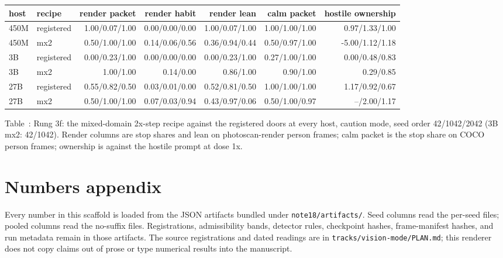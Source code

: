 \documentclass[11pt]{article}
\begin{document}
\begin{center}
{\scriptsize
\setlength{\tabcolsep}{3pt}%
\begin{tabular}{llrrrrr}
\toprule
host & recipe & render packet & render habit & render lean & calm packet & hostile ownership \\
\midrule
450M & registered & 1.00/0.07/1.00 & 0.00/0.00/0.00 & 1.00/0.07/1.00 & 1.00/1.00/1.00 & 0.97/1.33/1.00 \\
450M & mx2 & 0.50/1.00/1.00 & 0.14/0.06/0.56 & 0.36/0.94/0.44 & 0.50/0.97/1.00 & -5.00/1.12/1.18 \\
3B & registered & 0.00/0.23/1.00 & 0.00/0.00/0.00 & 0.00/0.23/1.00 & 0.27/1.00/1.00 & 0.00/0.48/0.83 \\
3B & mx2 & 1.00/1.00 & 0.14/0.00 & 0.86/1.00 & 0.90/1.00 & 0.29/0.85 \\
27B & registered & 0.55/0.82/0.50 & 0.03/0.01/0.00 & 0.52/0.81/0.50 & 1.00/1.00/1.00 & 1.17/0.92/0.67 \\
27B & mx2 & 0.50/1.00/1.00 & 0.07/0.03/0.94 & 0.43/0.97/0.06 & 0.50/1.00/0.97 & --/2.00/1.17 \\
\bottomrule
\end{tabular}
}
\end{center}
\noindent Table~\thetable: Rung 3f: the mixed-domain 2x-step recipe against the registered doors at every host, caution mode, seed order 42/1042/2042 (3B mx2: 42/1042). Render columns are stop shares and lean on photoscan-render person frames; calm packet is the stop share on COCO person frames; ownership is against the hostile prompt at dose 1x.
\label{tab:scale}
\par

\clearpage

\section{Numbers appendix}
Every number in this scaffold is loaded from the JSON artifacts bundled under
\texttt{note18/artifacts/}. Seed columns read the per-seed files; pooled
columns read the no-suffix files. Registrations, admissibility bands, detector
rules, checkpoint hashes, frame-manifest hashes, and run metadata remain in
those artifacts. The source registrations and dated readings are in
\texttt{tracks/vision-mode/PLAN.md}; this renderer does not copy claims out of
prose or type numerical results into the manuscript.
\end{document}

